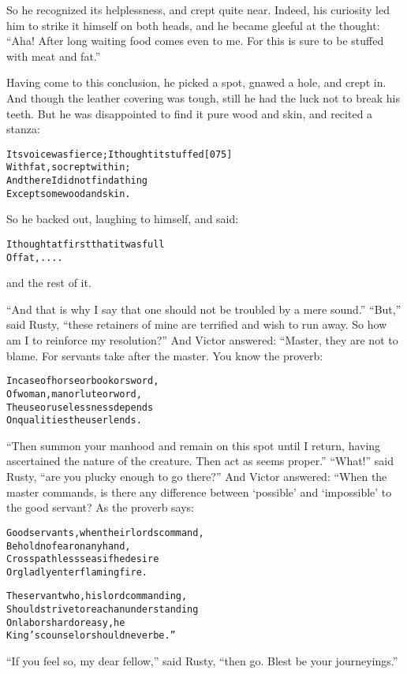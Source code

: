 \documentclass{article}
\renewenvironment{verbatim}{\begin{alltt}\normalfont\begin{centering}}{\end{centering}\end{alltt}}
\begin{document}
So he recognized its helplessness, and crept quite near. Indeed,
his curiosity led him to strike it himself on both heads, and he
became gleeful at the thought:
``Aha! After long waiting food comes even to me. For this is sure to be stuffed with meat and fat.''

Having come to this conclusion, he picked a spot, gnawed a hole,
and crept in. And though the leather covering was tough, still he
had the luck not to break his teeth. But he was disappointed to
find it pure wood and skin, and recited a stanza:

\begin{verbatim}
Its voice was fierce; I thought it stuffed              [075]
    With fat, so crept within;
And there I did not find a thing
    Except some wood and skin.
\end{verbatim}
So he backed out, laughing to himself, and said:

\begin{verbatim}
I thought at first that it was full
Of fat, ....
\end{verbatim}
and the rest of it.

``And that is why I say that one should not be troubled by a mere sound.''
``But,'' said Rusty,
``these retainers of mine are terrified and wish to run away. So how am I to reinforce my resolution?''
And Victor answered: “Master, they are not to blame. For servants
take after the master. You know the proverb:

\begin{verbatim}
In case of horse or book or sword,
Of woman, man or lute or word,
The use or uselessness depends
On qualities the user lends.
\end{verbatim}
``Then summon your manhood and remain on this spot until I return, having ascertained the nature of the creature. Then act as seems proper.''
``What!'' said Rusty, ``are you plucky enough to go there?'' And
Victor answered: “When the master commands, is there any difference
between `possible' and `impossible' to the good servant? As the
proverb says:

\begin{verbatim}
Good servants, when their lords command,
Behold no fear on any hand,
Cross pathless seas if he desire
Or gladly enter flaming fire.

The servant who, his lord commanding,
Should strive to reach an understanding
On labors hard or easy, he
King's counselor should never be.”
\end{verbatim}
``If you feel so, my dear fellow,'' said Rusty,
``then go. Blest be your journeyings.''
\end{document}
